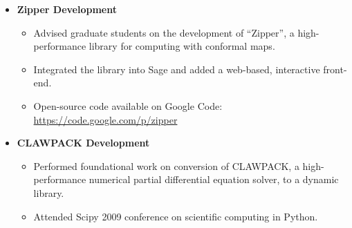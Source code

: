 \documentclass{article}
\begin{document}
\begin{itemize}
  \setlength{\itemsep}{0pt}
  \item {\bf Zipper Development}
    \begin{itemize}
    \item Advised graduate students on the development of ``Zipper'', a
      high-performance library for computing with conformal maps.
      \item Integrated the library into Sage and added a web-based, interactive
        front-end.
      \item Open-source code available on Google Code:
        \url{https://code.google.com/p/zipper}
    \end{itemize}
  \item {\bf CLAWPACK Development}
    \begin{itemize}
    \item Performed foundational work on conversion of CLAWPACK, a
      high-performance numerical partial differential equation solver, to a
      dynamic library.
    \item Attended Scipy 2009 conference on scientific computing in Python.
    \end{itemize}
\end{itemize}






\end{document}
